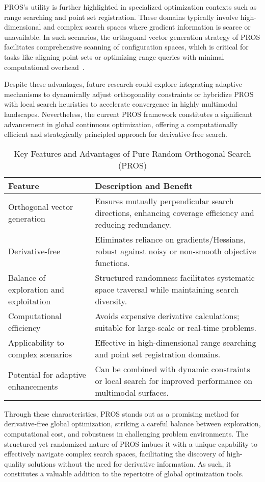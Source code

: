 \documentclass[11pt]{article}
\begin{document}
PROS’s utility is further highlighted in specialized optimization contexts such as range searching and point set registration. These domains typically involve high-dimensional and complex search spaces where gradient information is scarce or unavailable. In such scenarios, the orthogonal vector generation strategy of PROS facilitates comprehensive scanning of configuration spaces, which is critical for tasks like aligning point sets or optimizing range queries with minimal computational overhead~\cite{ref8}.

Despite these advantages, future research could explore integrating adaptive mechanisms to dynamically adjust orthogonality constraints or hybridize PROS with local search heuristics to accelerate convergence in highly multimodal landscapes. Nevertheless, the current PROS framework constitutes a significant advancement in global continuous optimization, offering a computationally efficient and strategically principled approach for derivative-free search.

\begin{table}[ht]
\centering
\caption{Key Features and Advantages of Pure Random Orthogonal Search (PROS)}
\label{tab:pros_features}
\begin{tabular}{p{5cm}p{9cm}}
\hline
\textbf{Feature} & \textbf{Description and Benefit} \\
\hline
Orthogonal vector generation & Ensures mutually perpendicular search directions, enhancing coverage efficiency and reducing redundancy. \\
Derivative-free & Eliminates reliance on gradients/Hessians, robust against noisy or non-smooth objective functions. \\
Balance of exploration and exploitation & Structured randomness facilitates systematic space traversal while maintaining search diversity. \\
Computational efficiency & Avoids expensive derivative calculations; suitable for large-scale or real-time problems. \\
Applicability to complex scenarios & Effective in high-dimensional range searching and point set registration domains. \\
Potential for adaptive enhancements & Can be combined with dynamic constraints or local search for improved performance on multimodal surfaces. \\
\hline
\end{tabular}
\end{table}

Through these characteristics, PROS stands out as a promising method for derivative-free global optimization, striking a careful balance between exploration, computational cost, and robustness in challenging problem environments. The structured yet randomized nature of PROS imbues it with a unique capability to effectively navigate complex search spaces, facilitating the discovery of high-quality solutions without the need for derivative information. As such, it constitutes a valuable addition to the repertoire of global optimization tools.
\end{document}
